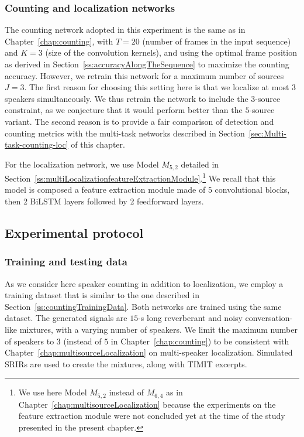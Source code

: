 \subsubsection{Counting and localization networks}

The counting network adopted in this experiment is the same as in Chapter~\ref{chap:counting}, with $T=20$ (number of frames in the input sequence) and $K=3$ (size of the convolution kernels), and using the optimal frame position as derived in Section~\ref{ss:accuracyAlongTheSequence} to maximize the counting accuracy. However, we retrain this network for a maximum number of sources $J=3$. The first reason for choosing this setting here is that we localize at most $3$ speakers simultaneously. We thus retrain the network to include the $3$-source constraint, as we conjecture that it would perform better than the $5$-source variant. The second reason is to provide a fair comparison of detection and counting metrics with the multi-task networks described in Section~\ref{sec:Multi-task-counting-loc} of this chapter.

For the localization network, we use Model $M_{5,2}$ detailed in Section~\ref{ss:multiLocalizationfeatureExtractionModule}.\footnote{We use here Model $M_{5,2}$ instead of $M_{6,4}$ as in Chapter~\ref{chap:multisourceLocalization} because the experiments on the feature extraction module were not concluded yet at the time of the study presented in the present chapter.} We recall that this model is composed a feature extraction module made of $5$ convolutional blocks, then 2 BiLSTM layers followed by 2 feedforward layers.

\subsection{Experimental protocol}
\subsubsection{Training and testing data}
\label{ss:trainingAndTestingNosPrediction}

As we consider here speaker counting in addition to localization, we employ a training dataset that is similar to the one described in Section~\ref{ss:countingTrainingData}. Both networks are trained using the same dataset. The generated signals are $15$-s long reverberant and noisy conversation-like mixtures, with a varying number of speakers. We limit the maximum number of speakers to $3$ (instead of $5$ in Chapter~\ref{chap:counting}) to be consistent with Chapter~\ref{chap:multisourceLocalization} on multi-speaker localization. Simulated SRIRs are used to create the mixtures, along with TIMIT \cite{garofolo_timit_1993} excerpts.

